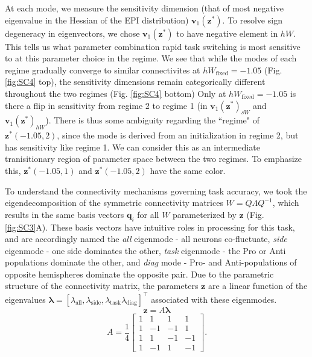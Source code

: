 \documentclass[11pt]{article}
\begin{document}
At each mode, we measure the sensitivity dimension (that of most negative eigenvalue in the Hessian of the EPI distribution) $\mathbf{v}_1(\mathbf{z}^*)$.
To resolve sign degeneracy in eigenvectors, we chose $\mathbf{v}_1(\mathbf{z}^*)$ to have negative element in $hW$.
This tells us what parameter combination rapid task switching is most sensitive to at this parameter choice in the regime.
We see that while the modes of each regime gradually converge to similar connectivites at $hW_{\text{fixed}} = -1.05$ (Fig. \ref{fig:SC4} top), the sensitivity dimensions remain categorically different throughout the two regimes (Fig. \ref{fig:SC4} bottom)
Only at $hW_{\text{fixed}} = -1.05$ is there a flip in sensitivity from regime 2 to regime 1 (in $\mathbf{v}_1(\mathbf{z}^*)_{sW}$ and $\mathbf{v}_1(\mathbf{z}^*)_{hW}$).
There is thus some ambiguity regarding the ``regime" of $\mathbf{z}^*(-1.05, 2)$, since the mode is derived from an initialization in regime 2, but has sensitivity like regime 1.
We can consider this as an intermediate tranisitionary region of parameter space between the two regimes.
To emphasize this, $\mathbf{z}^*(-1.05, 1)$ and $\mathbf{z}^*(-1.05, 2)$ have the same color.

To understand the connectivity mechanisms governing task accuracy, we took the eigendecomposition of the symmetric connectivity matrices $W = Q\Lambda Q^{-1}$, which results in the same basis vectors $\mathbf{q}_i$ for all $W$ parameterized by $\mathbf{z}$ (Fig. \ref{fig:SC3}A). 
These basis vectors have intuitive roles in processing for this task, and are accordingly named the \textit{all} eigenmode - all neurons co-fluctuate, \textit{side} eigenmode - one side dominates the other, \textit{task} eigenmode - the Pro or Anti populations dominate the other, and \textit{diag} mode - Pro- and Anti-populations of opposite hemispheres dominate the opposite pair. 
Due to the parametric structure of the connectivity matrix, the parameters $\mathbf{z}$ are a linear function of the eigenvalues $\bm{\lambda} = [\lambda_{\text{all}}, \lambda_{\text{side}}, \lambda_{\text{task}}\lambda_{\text{diag}}]^\top$ associated with these eigenmodes.
\begin{equation}
\mathbf{z} = A\bm{\lambda}
\end{equation}
\begin{equation}
A = \frac{1}{4} \begin{bmatrix} 1 & 1 & 1 & 1 \\ 1 & -1 & -1 & 1 \\ 1 & 1 & -1 & -1 \\ 1 & -1 & 1 & -1 \end{bmatrix}.
\end{equation}
\end{document}
